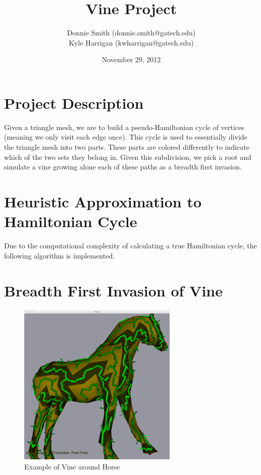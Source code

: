 \documentclass[letterpaper,10pt]{IEEEtran}
\title{Vine Project}
\author{
Donnie Smith (donnie.smith@gatech.edu) \\
Kyle Harrigan (kwharrigan@gatech.edu) 
}
\date{November 29, 2012}                                           %
\begin{document}


\maketitle

 
 
 


%

\section{Project Description}

Given a triangle mesh, we are to build a pseudo-Hamiltonian cycle of vertices (meaning we only visit each edge once).   This cycle is used to essentially divide the triangle mesh into two parts.  These parts are colored differently to indicate which of the two sets they belong in.  Given this subdivision, we pick a root and simulate a vine growing alone each of these paths as a breadth first invasion. 

\section{Heuristic Approximation to Hamiltonian Cycle }

Due to the computational complexity of calculating a true Hamiltonian cycle, the following algorithm is implemented. 

\section{Breadth First Invasion of Vine}


\begin{figure}[!h]
\centering
\includegraphics[width=3in]{data/vine}
\caption{Example of Vine around Horse}
\label{fig_angle}
\end{figure}
\end{document}
